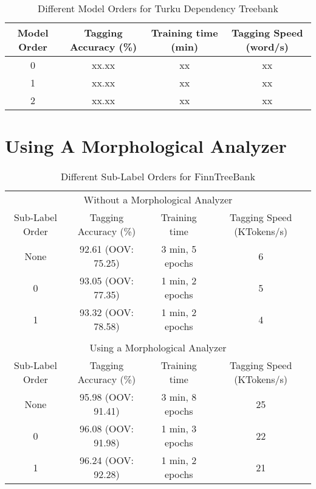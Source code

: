 \begin{table}[htb!]
\begin{center}
\begin{tabular}{cccc}
Model Order & Tagging Accuracy (\%) & Training time (min) & Tagging Speed (word/s)\\
\hline
0        & xx.xx            & xx            & xx            \\
1        & xx.xx            & xx            & xx            \\
2        & xx.xx            & xx            & xx            \\
\hline
\end{tabular}
\caption{Different Model Orders for Turku Dependency Treebank}
\end{center}
\end{table}

\section{Using A Morphological Analyzer}

\begin{table}[htb!]
\begin{center}
\begin{tabular}{cccc}
\multicolumn{4}{c}{Without a Morphological Analyzer}\\
Sub-Label Order & Tagging Accuracy (\%) & Training time    & Tagging Speed (KTokens/s)\\
\hline
None            & 92.61 (OOV: 75.25)    & 3 min, 5 epochs  & 6                       \\
0               & 93.05 (OOV: 77.35)    & 1 min, 2 epochs  & 5                       \\
1               & 93.32 (OOV: 78.58)    & 1 min, 2 epochs  & 4                       \\
\hline
                &                       &                  &                          \\
\multicolumn{4}{c}{Using a Morphological Analyzer}\\
Sub-Label Order & Tagging Accuracy (\%) & Training time    & Tagging Speed (KTokens/s)\\
\hline
None     & 95.98 (OOV: 91.41)           & 3 min, 8 epochs  & 25                       \\
0        & 96.08 (OOV: 91.98)           & 1 min, 3 epochs  & 22                       \\
1        & 96.24 (OOV: 92.28)           & 1 min, 2 epochs  & 21                       \\
\hline
\end{tabular}
\caption{Different Sub-Label Orders for FinnTreeBank}
\end{center}
\end{table}

